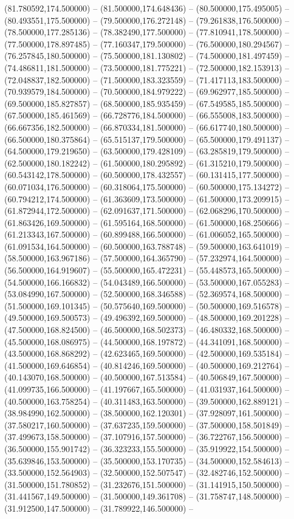 (81.780592,174.500000) -- (81.500000,174.648436) -- (80.500000,175.495005) -- (80.493551,175.500000) -- (79.500000,176.272148) -- (79.261838,176.500000) -- (78.500000,177.285136) -- (78.382490,177.500000) -- (77.810941,178.500000) -- (77.500000,178.897485) -- (77.160347,179.500000) -- (76.500000,180.294567) -- (76.257845,180.500000) -- (75.500000,181.130802) -- (74.500000,181.497459) -- (74.486811,181.500000) -- (73.500000,181.775221) -- (72.500000,182.153913) -- (72.048837,182.500000) -- (71.500000,183.323559) -- (71.417113,183.500000) -- (70.939579,184.500000) -- (70.500000,184.979222) -- (69.962977,185.500000) -- (69.500000,185.827857) -- (68.500000,185.935459) -- (67.549585,185.500000) -- (67.500000,185.461569) -- (66.728776,184.500000) -- (66.555008,183.500000) -- (66.667356,182.500000) -- (66.870334,181.500000) -- (66.617740,180.500000) -- (66.500000,180.375864) -- (65.515137,179.500000) -- (65.500000,179.491137) -- (64.500000,179.219650) -- (63.500000,179.428109) -- (63.285819,179.500000) -- (62.500000,180.182242) -- (61.500000,180.295892) -- (61.315210,179.500000) -- (60.543142,178.500000) -- (60.500000,178.432557) -- (60.131415,177.500000) -- (60.071034,176.500000) -- (60.318064,175.500000) -- (60.500000,175.134272) -- (60.794212,174.500000) -- (61.363609,173.500000) -- (61.500000,173.209915) -- (61.872944,172.500000) -- (62.091637,171.500000) -- (62.068296,170.500000) -- (61.863426,169.500000) -- (61.595164,168.500000) -- (61.500000,168.250666) -- (61.213343,167.500000) -- (60.899488,166.500000) -- (61.006052,165.500000) -- (61.091534,164.500000) -- (60.500000,163.788748) -- (59.500000,163.641019) -- (58.500000,163.967186) -- (57.500000,164.365790) -- (57.232974,164.500000) -- (56.500000,164.919607) -- (55.500000,165.472231) -- (55.448573,165.500000) -- (54.500000,166.166832) -- (54.043489,166.500000) -- (53.500000,167.055283) -- (53.084990,167.500000) -- (52.500000,168.346588) -- (52.369574,168.500000) -- (51.500000,169.101345) -- (50.575640,169.500000) -- (50.500000,169.516578) -- (49.500000,169.500573) -- (49.496392,169.500000) -- (48.500000,169.201228) -- (47.500000,168.824500) -- (46.500000,168.502373) -- (46.480332,168.500000) -- (45.500000,168.086975) -- (44.500000,168.197872) -- (44.341091,168.500000) -- (43.500000,168.868292) -- (42.623465,169.500000) -- (42.500000,169.535184) -- (41.500000,169.646854) -- (40.814246,169.500000) -- (40.500000,169.212764) -- (40.143070,168.500000) -- (40.500000,167.513584) -- (40.506849,167.500000) -- (41.099735,166.500000) -- (41.197667,165.500000) -- (41.031937,164.500000) -- (40.500000,163.758254) -- (40.311483,163.500000) -- (39.500000,162.889121) -- (38.984990,162.500000) -- (38.500000,162.120301) -- (37.928097,161.500000) -- (37.580217,160.500000) -- (37.637235,159.500000) -- (37.500000,158.501849) -- (37.499673,158.500000) -- (37.107916,157.500000) -- (36.722767,156.500000) -- (36.500000,155.901742) -- (36.323233,155.500000) -- (35.919922,154.500000) -- (35.639846,153.500000) -- (35.500000,153.170735) -- (34.500000,152.584613) -- (33.500000,152.564903) -- (32.500000,152.507547) -- (32.482746,152.500000) -- (31.500000,151.780852) -- (31.232676,151.500000) -- (31.141915,150.500000) -- (31.441567,149.500000) -- (31.500000,149.361708) -- (31.758747,148.500000) -- (31.912500,147.500000) -- (31.789922,146.500000) -- 